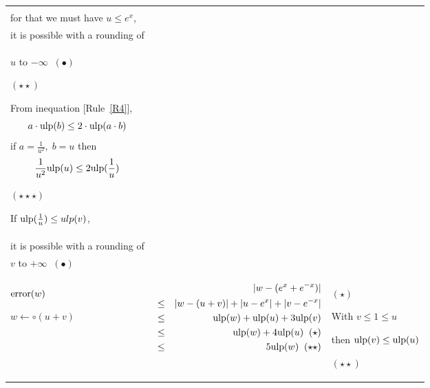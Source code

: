 \documentclass[12pt]{amsart}
\def\ulp{{\rm ulp}}
\newcommand{\U}[1]{\quad \mbox{[Rule~\ref{#1}]}}
\begin{document}
\begin{center}
\begin{tabular}{l l l}
\begin{minipage}{7.5cm}
\end{minipage} &
\begin{minipage}{6cm}

$(\star)$

With $\frac{1}{e^x} \leq \frac{1}{u}$,\\
for that we must have $u \leq e^x$,\\
it is possible with a rounding of\\
$u$ to $-\infty \;\; (\bullet)$

$(\star\star)$

From inequation \U{R4},
\[   a \cdot \ulp(b) \leq 2 \cdot \ulp(a \cdot b)\]
if $a =\frac{1}{u^2},\;b = u$ then
\[ \frac{1}{u^2} \ulp(u)  \leq 2 \ulp(\frac{1}{u})\]

$(\star\star\star)$

If $\ulp(\frac{1}{u}) \leq ulp(v)$,\\
it is possible with a rounding of \\
$v$ to $+\infty \;\; (\bullet)$\\



\end{minipage}\\%
\begin{minipage}{2.5cm}
${\textnormal{error}}(w)$


$w \leftarrow \circ(u+v) $
\end{minipage} &
\begin{minipage}{7.5cm}



\begin{eqnarray}\nonumber
  &&|w-(e^{x}+e^{-x})| \\\nonumber
  &       \leq&  |w - (u+v)|+|u - e^x|+|v - e^{-x}|\\\nonumber
  &       \leq& \ulp(w) + \ulp(u) + 3\ulp(v)\\\nonumber
  &       \leq& \ulp(w) + 4\ulp(u)\;\;(\star)\\\nonumber
  &       \leq& 5\ulp(w)\;\;(\star\star)\\\nonumber
\end{eqnarray}


\end{minipage} &
\begin{minipage}{6cm}

$(\star)$

With $v \leq 1\leq u$

then $\ulp(v) \leq \ulp(u)$

$(\star\star)$


\end{minipage}
\end{tabular}
\end{center}
\end{document}
